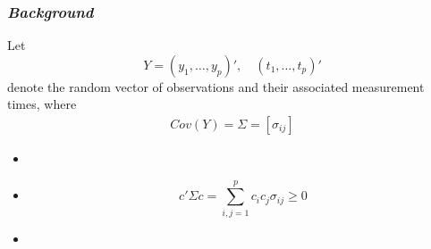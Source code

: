 
{ %
\begin{frame}[c]%
 \titlepage
\end{frame}
}

\begin{frame}
\frametitle{\textit{Background}}
Let 
\[
Y = \left(y_1,\dots, y_p\right)', \quad \left(t_1,\dots, t_p\right)'
\]
denote the random vector of observations and their associated measurement times, where 
\begin{align*}
 Cov\left(Y\right) = \Sigma = \left[ \sigma_{ij} \right] 
\end{align*}

\begin{itemize}
\item {} \pause
\item {}
\begin{equation*}
 		c'\Sigma c = \sum_{i,j = 1}^p c_i c_j \sigma_{ij} \ge 0
\end{equation*} \pause
\item {} 
\end{itemize}
\end{frame}



